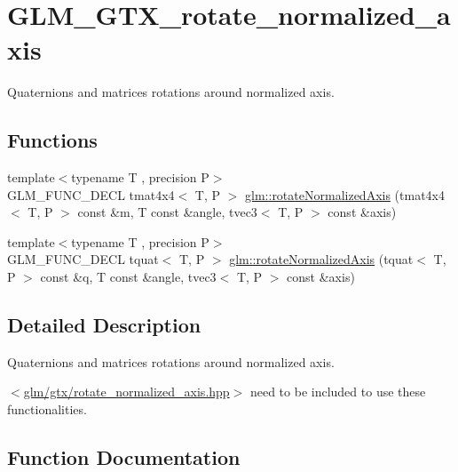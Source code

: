 \hypertarget{group__gtx__rotate__normalized__axis}{}\section{G\+L\+M\+\_\+\+G\+T\+X\+\_\+rotate\+\_\+normalized\+\_\+axis}
\label{group__gtx__rotate__normalized__axis}


Quaternions and matrices rotations around normalized axis.  


\subsection*{Functions}
\begin{DoxyCompactItemize}
\item 
{\footnotesize template$<$typename T , precision P$>$ }\\G\+L\+M\+\_\+\+F\+U\+N\+C\+\_\+\+D\+E\+C\+L tmat4x4$<$ T, P $>$ \hyperlink{group__gtx__rotate__normalized__axis_gaada623964a895def5a8b77b5b7887dc4}{glm\+::rotate\+Normalized\+Axis} (tmat4x4$<$ T, P $>$ const \&m, T const \&angle, tvec3$<$ T, P $>$ const \&axis)
\item 
{\footnotesize template$<$typename T , precision P$>$ }\\G\+L\+M\+\_\+\+F\+U\+N\+C\+\_\+\+D\+E\+C\+L tquat$<$ T, P $>$ \hyperlink{group__gtx__rotate__normalized__axis_ga6c00234d844faef36a6a94669fbd1639}{glm\+::rotate\+Normalized\+Axis} (tquat$<$ T, P $>$ const \&q, T const \&angle, tvec3$<$ T, P $>$ const \&axis)
\end{DoxyCompactItemize}


\subsection{Detailed Description}
Quaternions and matrices rotations around normalized axis. 

$<$\hyperlink{rotate__normalized__axis_8hpp}{glm/gtx/rotate\+\_\+normalized\+\_\+axis.\+hpp}$>$ need to be included to use these functionalities. 

\subsection{Function Documentation}
\hypertarget{group__gtx__rotate__normalized__axis_gaada623964a895def5a8b77b5b7887dc4}{}
